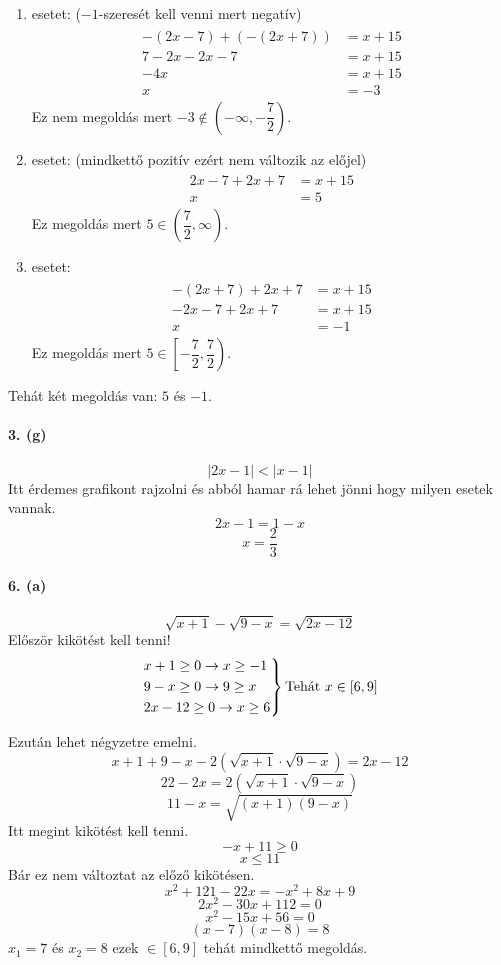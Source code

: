 \documentclass[12pt,a4paper,fleqn]{article}
\newcommand{\myparagraph}[1]{\paragraph{#1}\mbox{}}
\begin{document}
\begin{enumerate}
  \item esetet: ($-1$-szeresét kell venni mert negatív)
  \begin{align*}
    \begin{split}
      -(2x-7)+(-(2x+7)) &= x + 15 \\
      7-2x-2x-7&=x+15 \\
      -4x&=x+15 \\
      x &=-3
    \end{split}
  \end{align*}
  Ez nem megoldás mert $-3 \notin (-\infty, -\dfrac{7}{2})$.
  \item esetet: (mindkettő pozitív ezért nem változik az előjel)
  \begin{align*}
    \begin{split}
      2x-7+2x+7 &= x + 15 \\
      x &= 5
    \end{split}
  \end{align*}
  Ez megoldás mert $5 \in (\dfrac{7}{2}, \infty)$.
  \item esetet:
  \begin{align*}
    \begin{split}
      -(2x+7)+2x+7 &= x + 15 \\
      -2x-7+2x+7 &= x + 15 \\
      x &= -1
    \end{split}
  \end{align*}
  Ez megoldás mert $5 \in \left[ -\dfrac{7}{2}, \dfrac{7}{2} \right)$.
\end{enumerate}
Tehát két megoldás van: $5$ és $-1$.


\myparagraph{3. (g)}
\[ |2x-1| < |x-1| \]
Itt érdemes grafikont rajzolni és abból hamar rá lehet jönni hogy milyen esetek vannak.
\[ 2x-1 = 1-x \]
\[ x = \dfrac{2}{3} \]


\myparagraph{6. (a)}
\[ \sqrt{x+1} - \sqrt{9-x} = \sqrt{2x-12} \]
Először kikötést kell tenni!
\[
\begin{rcases*}
  x+1 \geq 0 \rightarrow x \geq -1 \\
  9-x \geq 0 \rightarrow 9 \geq x \\
  2x-12 \geq 0 \rightarrow x \geq 6
\end{rcases*} \text{Tehát } x \in [6, 9]
\]

Ezután lehet négyzetre emelni.
\[ x+1+9-x-2(\sqrt{x+1} \cdot \sqrt{9-x}) = 2x-12 \]
\[ 22-2x = 2(\sqrt{x+1} \cdot \sqrt{9-x}) \]
\[ 11-x = \sqrt{(x+1)(9-x)} \]
Itt megint kikötést kell tenni.
\[ -x + 11 \geq 0 \]
\[ x \leq 11 \]
Bár ez nem változtat az előző kikötésen.
\[ x^2 + 121 - 22x = -x^2 + 8x + 9 \]
\[ 2x^2 -30x +112 = 0 \]
\[ x^2 -15x +56 = 0 \]
\[ (x-7)(x-8) = 8 \]
$ x_1 = 7 $ és $ x_2=8 $ ezek $\in [6,9]$ tehát mindkettő megoldás.
\end{document}
